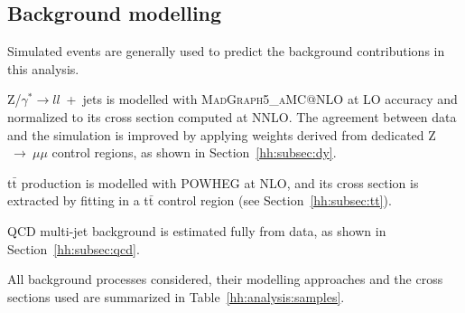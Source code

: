 \documentclass[../main.tex]{subfiles}
\begin{document}
\subsection{Background modelling}
\label{hh:subsec:bkg_modelling}

Simulated events are generally used to predict the background contributions in this analysis.

Z/$\gamma^*\to ll$~+~jets is modelled with \textsc{MadGraph5\_aMC@NLO} at LO accuracy and normalized to its cross section computed at NNLO. The agreement between data and the simulation is improved by applying weights derived from dedicated Z$~\to~\mu\mu$ control regions, as shown in Section~\ref{hh:subsec:dy}. 

t$\bar{\text{t}}$ production is modelled with \textsc{POWHEG} at NLO, and its cross section is extracted by fitting in a t$\bar{\text{t}}$ control region (see Section~\ref{hh:subsec:tt}).

QCD multi-jet background is estimated fully from data, as shown in Section~\ref{hh:subsec:qcd}.

All background processes considered, their modelling approaches and the cross sections used are summarized in Table~\ref{hh:analysis:samples}.
\end{document}

